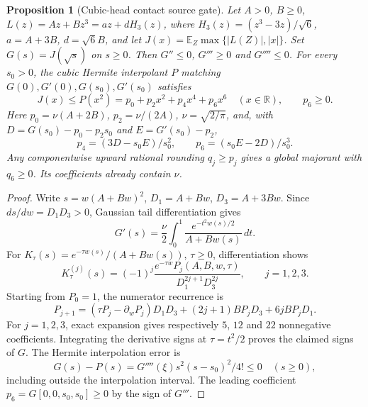 \documentclass[11pt]{article}
\newtheorem{proposition}[theorem]{Proposition}
\begin{document}
\begin{proposition}[Cubic-head contact source gate]\label{prop:contact-head-source}
Let $A>0$, $B\ge0$, $L(z)=Az+Bz^3=a z+dH_3(z)$, where
$H_3(z)=(z^3-3z)/\sqrt6$, $a=A+3B$, $d=\sqrt6B$, and let
$J(x)=\mathbb E_Z\max\{|L(Z)|,|x|\}$.
Set $G(s)=J(\sqrt s)$ on $s\ge0$.  Then
$G''\le0$, $G'''\ge0$ and $G''''\le0$.
For every $s_0>0$, the cubic Hermite interpolant $P$ matching
$G(0),G'(0),G(s_0),G'(s_0)$ satisfies
\[
 J(x)\le P(x^2)=p_0+p_2x^2+p_4x^4+p_6x^6
 \quad(x\in\mathbb R),\qquad p_6\ge0.
\]
Here $p_0=\nu(A+2B)$, $p_2=\nu/(2A)$, $\nu=\sqrt{2/\pi}$, and, with
$D=G(s_0)-p_0-p_2s_0$ and $E=G'(s_0)-p_2$,
\[
 p_4=(3D-s_0E)/s_0^2,\qquad p_6=(s_0E-2D)/s_0^3.
\]
Any componentwise upward rational rounding $q_j\ge p_j$ gives a global
majorant with $q_6\ge0$.  Its coefficients already contain $\nu$.
\end{proposition}
\begin{proof}
Write $s=w(A+Bw)^2$, $D_1=A+Bw$, $D_3=A+3Bw$.
Since $ds/dw=D_1D_3>0$, Gaussian tail differentiation gives
\[
 G'(s)=\frac\nu2\int_0^1
       \frac{e^{-t^2w(s)/2}}{A+Bw(s)}\,dt.
\]
For $K_\tau(s)=e^{-\tau w(s)}/(A+Bw(s))$, $\tau\ge0$, differentiation
shows
\[
 K_\tau^{(j)}(s)=(-1)^j
  \frac{e^{-\tau w}P_j(A,B,w,\tau)}{D_1^{2j+1}D_3^{2j}},\qquad j=1,2,3.
\]
Starting from $P_0=1$, the numerator recurrence is
\[
 P_{j+1}=(\tau P_j-\partial_wP_j)D_1D_3
       +(2j+1)BP_jD_3+6jBP_jD_1.
\]
For $j=1,2,3$, exact expansion gives respectively $5$, $12$ and $22$
nonnegative coefficients.  Integrating the derivative signs at
$\tau=t^2/2$ proves the claimed signs of $G$.
The Hermite interpolation error is
\[
 G(s)-P(s)=G''''(\xi)s^2(s-s_0)^2/4!\le0
 \quad(s\ge0),
\]
including outside the interpolation interval.  The leading coefficient
$p_6=G[0,0,s_0,s_0]\ge0$ by the sign of $G'''$.
\end{proof}
\end{document}
